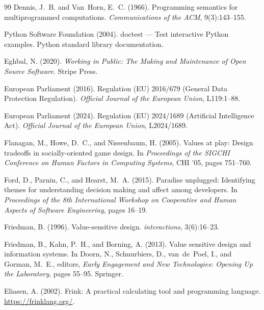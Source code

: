 \documentclass[11pt,a4paper]{article}
\begin{document}
\begin{thebibliography}{99}
Dennis, J.~B. and Van~Horn, E.~C. (1966).
\newblock Programming semantics for multiprogrammed computations.
\newblock \emph{Communications of the ACM}, 9(3):143--155.

{Python Software Foundation} (2004).
\newblock doctest --- Test interactive {Python} examples.
\newblock Python standard library documentation.

Eghbal, N. (2020).
\newblock \emph{Working in Public: The Making and Maintenance of Open Source
  Software}.
\newblock Stripe Press.

{European Parliament} (2016).
\newblock Regulation ({EU}) 2016/679 ({General Data Protection Regulation}).
\newblock \emph{Official Journal of the European Union}, L119:1--88.

{European Parliament} (2024).
\newblock Regulation ({EU}) 2024/1689 ({Artificial Intelligence Act}).
\newblock \emph{Official Journal of the European Union}, L2024/1689.

Flanagan, M., Howe, D.~C., and Nissenbaum, H. (2005).
\newblock Values at play: Design tradeoffs in socially-oriented game design.
\newblock In \emph{Proceedings of the SIGCHI Conference on Human Factors in
  Computing Systems}, CHI '05, pages 751--760.

Ford, D., Parnin, C., and Hearst, M.~A. (2015).
\newblock Paradise unplugged: Identifying themes for understanding decision
  making and affect among developers.
\newblock In \emph{Proceedings of the 8th International Workshop on Cooperative
  and Human Aspects of Software Engineering}, pages 16--19.

Friedman, B. (1996).
\newblock Value-sensitive design.
\newblock \emph{interactions}, 3(6):16--23.

Friedman, B., Kahn, P.~H., and Borning, A. (2013).
\newblock Value sensitive design and information systems.
\newblock In Doorn, N., Schuurbiers, D., van~de~Poel, I., and Gorman, M.~E.,
  editors, \emph{Early Engagement and New Technologies: Opening Up the
  Laboratory}, pages 55--95. Springer.

Eliasen, A. (2002).
\newblock Frink: A practical calculating tool and programming language.
\newblock \url{https://frinklang.org/}.


\end{thebibliography}
\end{document}
